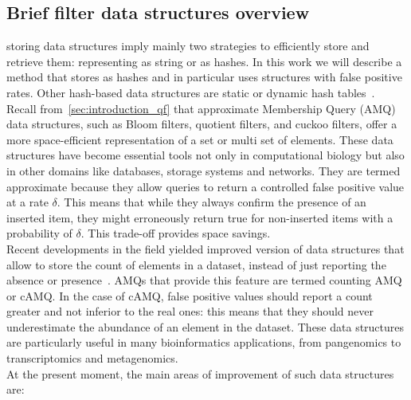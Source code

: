 \subsection{Brief filter data structures overview}
\kmer storing data structures imply mainly two strategies to efficiently store and retrieve them: representing \kmers as string or as hashes\cite{marchet2024kmersets}. In this work we will describe a method that stores \kmers as hashes and in particular uses structures with false positive rates. Other hash-based data structures are static or dynamic hash tables~\cite{sshash}.\\
Recall from~\ref{sec:introduction_qf} that approximate Membership Query (AMQ) data structures, such as Bloom filters, quotient filters, and cuckoo filters, offer a more space-efficient representation of a set or multi set of elements. These data structures have become essential tools not only in computational biology but also in other domains like databases, storage systems and networks. They are termed approximate because they allow queries to return a controlled false positive value at a rate $\delta$. This means that while they always confirm the presence of an inserted item, they might erroneously return true for non-inserted items with a probability of $\delta$. This trade-off provides space savings.\\
Recent developments in the \kmer field yielded improved version of data structures that allow to store the count of elements in a dataset, instead of just reporting the absence or presence~\cite{squeakr,pandey,cqf,comin_count,sshash}. AMQs that provide this feature are termed counting AMQ or cAMQ. In the case of cAMQ, false positive values should report a count greater and not inferior to the real ones: this means that they should never underestimate the abundance of an element in the dataset. These data structures are particularly useful in many bioinformatics applications, from pangenomics to transcriptomics and metagenomics.\\
At the present moment, the main areas of improvement of such data structures are:
